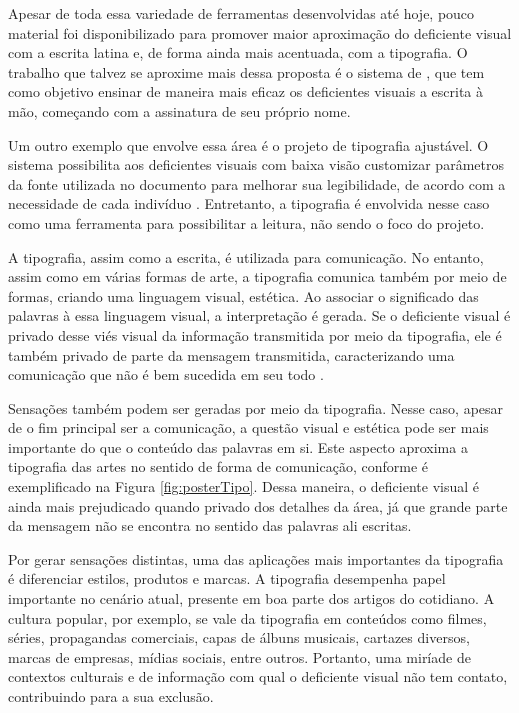 Apesar de toda essa variedade de ferramentas desenvolvidas até hoje, pouco material foi disponibilizado para promover maior aproximação do deficiente visual com a escrita latina e, de forma ainda mais acentuada, com a tipografia. O trabalho que talvez se aproxime mais dessa proposta é o sistema de , que tem como objetivo ensinar de maneira mais eficaz os deficientes visuais a escrita à mão, começando com a assinatura de seu próprio nome.


Um outro exemplo que envolve essa área é o projeto de tipografia ajustável. O sistema possibilita aos deficientes visuais com baixa visão customizar parâmetros da fonte utilizada no documento para melhorar sua legibilidade, de acordo com a necessidade de cada indivíduo . Entretanto, a tipografia é envolvida nesse caso como uma ferramenta para possibilitar a leitura, não sendo o foco do projeto.


A tipografia, assim como a escrita, é utilizada para comunicação. No entanto, assim como em várias formas de arte, a tipografia comunica também por meio de formas, criando uma linguagem visual, estética. Ao associar o significado das palavras à essa linguagem visual, a interpretação é gerada. Se o deficiente visual é privado desse viés visual da informação transmitida por meio da tipografia, ele é também privado de parte da mensagem transmitida, caracterizando uma comunicação que não é bem sucedida em seu todo .

Sensações também podem ser geradas por meio da tipografia. Nesse caso, apesar de o fim principal ser a comunicação, a questão visual e estética pode ser mais importante do que o conteúdo das palavras em si. Este aspecto aproxima a tipografia das artes no sentido de forma de comunicação, conforme é exemplificado na Figura \ref{fig:posterTipo}. Dessa maneira, o deficiente visual é ainda mais prejudicado quando privado dos detalhes da área, já que grande parte da mensagem não se encontra no sentido das palavras ali escritas.


Por gerar sensações distintas, uma das aplicações mais importantes da tipografia é diferenciar estilos, produtos e marcas. A tipografia desempenha papel importante no cenário atual, presente em boa parte dos artigos do cotidiano. A cultura popular, por exemplo, se vale da tipografia em conteúdos como filmes, séries, propagandas comerciais, capas de álbuns musicais, cartazes diversos, marcas de empresas, mídias sociais, entre outros. Portanto, uma miríade de contextos culturais e de informação com qual o deficiente visual não tem contato, contribuindo para a sua exclusão.

